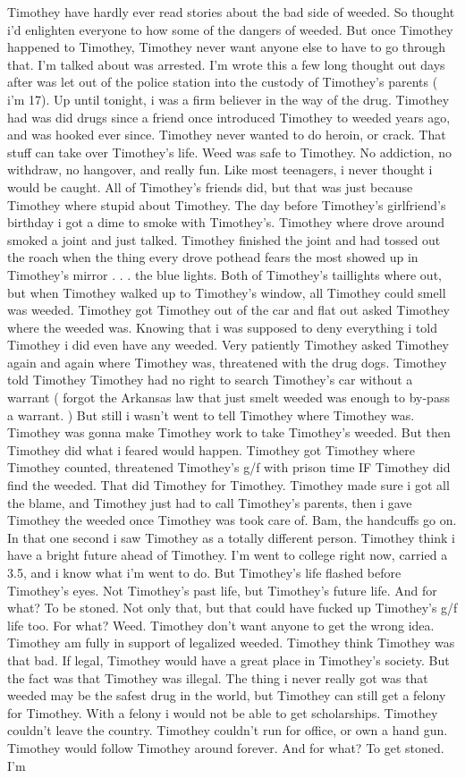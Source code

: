\documentclass[12pt]{book}
\begin{document}
Timothey have hardly ever read stories about the bad side of weeded. So thought i'd enlighten everyone to how some of the dangers of weeded. But once Timothey happened to Timothey, Timothey never want anyone else to have to go through that. I'm talked about was arrested. I'm wrote this a few long thought out days after was let out of the police station into the custody of Timothey's parents ( i'm 17). Up until tonight, i was a firm believer in the way of the drug. Timothey had was did drugs since a friend once introduced Timothey to weeded years ago, and was hooked ever since. Timothey never wanted to do heroin, or crack. That stuff can take over Timothey's life. Weed was safe to Timothey. No addiction, no withdraw, no hangover, and really fun. Like most teenagers, i never thought i would be caught. All of Timothey's friends did, but that was just because Timothey where stupid about Timothey. The day before Timothey's girlfriend's birthday i got a dime to smoke with Timothey's. Timothey where drove around smoked a joint and just talked. Timothey finished the joint and had tossed out the roach when the thing every drove pothead fears the most showed up in Timothey's mirror . . .  the blue lights. Both of Timothey's taillights where out, but when Timothey walked up to Timothey's window, all Timothey could smell was weeded. Timothey got Timothey out of the car and flat out asked Timothey where the weeded was. Knowing that i was supposed to deny everything i told Timothey i did even have any weeded. Very patiently Timothey asked Timothey again and again where Timothey was, threatened with the drug dogs. Timothey told Timothey Timothey had no right to search Timothey's car without a warrant ( forgot the Arkansas law that just smelt weeded was enough to by-pass a warrant. ) But still i wasn't went to tell Timothey where Timothey was. Timothey was gonna make Timothey work to take Timothey's weeded. But then Timothey did what i feared would happen. Timothey got Timothey where Timothey counted, threatened Timothey's g/f with prison time IF Timothey did find the weeded. That did Timothey for Timothey. Timothey made sure i got all the blame, and Timothey just had to call Timothey's parents, then i gave Timothey the weeded once Timothey was took care of. Bam, the handcuffs go on. In that one second i saw Timothey as a totally different person. Timothey think i have a bright future ahead of Timothey. I'm went to college right now, carried a 3.5, and i know what i'm went to do. But Timothey's life flashed before Timothey's eyes. Not Timothey's past life, but Timothey's future life. And for what? To be stoned. Not only that, but that could have fucked up Timothey's g/f life too. For what? Weed. Timothey don't want anyone to get the wrong idea. Timothey am fully in support of legalized weeded. Timothey think Timothey was that bad. If legal, Timothey would have a great place in Timothey's society. But the fact was that Timothey was illegal. The thing i never really got was that weeded may be the safest drug in the world, but Timothey can still get a felony for Timothey. With a felony i would not be able to get scholarships. Timothey couldn't leave the country. Timothey couldn't run for office, or own a hand gun. Timothey would follow Timothey around forever. And for what? To get stoned. I'm 
\end{document}
